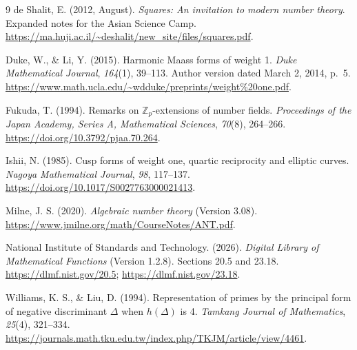 \documentclass[11pt]{article}
\begin{document}
\begin{thebibliography}{9}
de Shalit, E. (2012, August).
\emph{Squares: An invitation to modern number theory}.
Expanded notes for the Asian Science Camp.
\url{https://ma.huji.ac.il/~deshalit/new_site/files/squares.pdf}.

Duke, W., \& Li, Y. (2015). Harmonic Maass forms of weight 1.
\emph{Duke Mathematical Journal}, \emph{164}(1), 39--113.
Author version dated March 2, 2014, p.~5.
\url{https://www.math.ucla.edu/~wdduke/preprints/weight%20one.pdf}.

Fukuda, T. (1994). Remarks on $\mathbb Z_p$-extensions of number fields.
\emph{Proceedings of the Japan Academy, Series A, Mathematical Sciences},
\emph{70}(8), 264--266.
\url{https://doi.org/10.3792/pjaa.70.264}.

Ishii, N. (1985). Cusp forms of weight one, quartic reciprocity and
elliptic curves. \emph{Nagoya Mathematical Journal}, \emph{98}, 117--137.
\url{https://doi.org/10.1017/S0027763000021413}.

Milne, J. S. (2020). \emph{Algebraic number theory} (Version 3.08).
\url{https://www.jmilne.org/math/CourseNotes/ANT.pdf}.

National Institute of Standards and Technology. (2026).
\emph{Digital Library of Mathematical Functions} (Version 1.2.8).
Sections 20.5 and 23.18.
\url{https://dlmf.nist.gov/20.5}; \url{https://dlmf.nist.gov/23.18}.

Williams, K. S., \& Liu, D. (1994).
Representation of primes by the principal form of negative discriminant
$\Delta$ when $h(\Delta)$ is 4.
\emph{Tamkang Journal of Mathematics}, \emph{25}(4), 321--334.
\url{https://journals.math.tku.edu.tw/index.php/TKJM/article/view/4461}.
\end{thebibliography}
\end{document}
